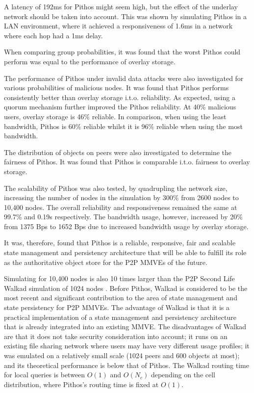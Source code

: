 A latency of 192ms for Pithos might seem high, but the effect of the underlay network should be taken into account. This was shown by simulating Pithos in a LAN environment, where it achieved a responsiveness of 1.6ms in a network where each hop had a 1ms delay.

When comparing group probabilities, it was found that the worst Pithos could perform was equal to the performance of overlay storage.

The performance of Pithos under invalid data attacks were also investigated for various probabilities of malicious nodes. It was found that Pithos performs consistently better than overlay storage i.t.o. reliability. As expected, using a quorum mechanism further improved the Pithos reliability. At 40\% malicious users, overlay storage is 46\% reliable. In comparison, when using the least bandwidth, Pithos is 60\% reliable whilst it is 96\% reliable when using the most bandwidth.

The distribution of objects on peers were also investigated to determine the fairness of Pithos. It was found that Pithos is comparable i.t.o. fairness to overlay storage.

The scalability of Pithos was also tested, by quadrupling the network size, increasing the number of nodes in the simulation by 300\% from 2600 nodes to 10,400 nodes. The overall reliability and responsiveness remained the same at 99.7\% and 0.19s respectively. The bandwidth usage, however, increased by 20\% from 1375 Bps to 1652 Bps due to increased bandwidth usage by overlay storage.

It was, therefore, found that Pithos is a reliable, responsive, fair and scalable state management and persistency architecture that will be able to fulfill its role as the authoritative object store for the P2P MMVEs of the future.

Simulating for 10,400 nodes is also 10 times larger than the P2P Second Life Walkad simulation of 1024 nodes \cite{Walkad_Varvello}. Before Pithos, Walkad is considered to be the most recent and significant contribution to the area of state management and state persistency for P2P MMVEs. The advantage of Walkad is that it is a practical implementation of a state management and persistency architecture that is already integrated into an existing MMVE. The disadvantages of Walkad are that it does not take security consideration into account; it runs on an existing file sharing network where users may have very different usage profiles; it was emulated on a relatively small scale (1024 peers and 600 objects at most); and its theoretical performance is below that of Pithos. The Walkad routing time for local queries is between $O(1)$ and $O(N_c)$ depending on the cell distribution, where Pithos's routing time is fixed at $O(1)$.

